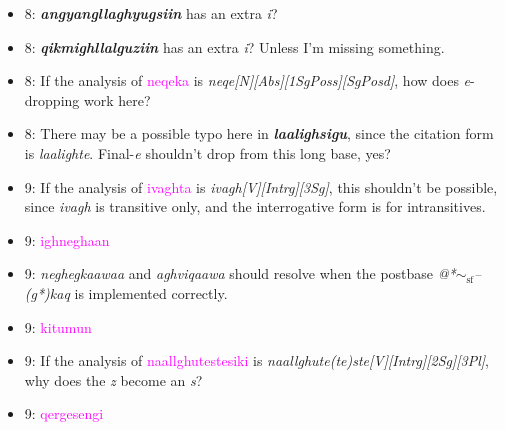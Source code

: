 \documentclass{article}
\begin{document}
\begin{itemize}
\item 8: \textit{\textbf{angyangllaghyugsiin}} has an extra \textit{i}?

\item 8: \textit{\textbf{qikmighllalguziin}} has an extra \textit{i}?
%
Unless I'm missing something.

\item 8: If the analysis of \textcolor{magenta}{neqeka} is \textit{neqe[N][Abs][1SgPoss][SgPosd]}, how does \textit{e}-dropping work here?

\item 8: There may be a possible typo here in \textit{\textbf{laalighsigu}}, since the citation form is \textit{laalighte}.
%
Final-\textit{e} shouldn't drop from this long base, yes?

\item 9: If the analysis of \textcolor{magenta}{ivaghta} is \textit{ivagh[V][Intrg][3Sg]}, this shouldn't be possible, since \textit{ivagh} is transitive only, and the interrogative form is for intransitives.

\item 9: \textcolor{magenta}{ighneghaan}

\item 9: \textit{neghegkaawaa} and \textit{aghviqaawa} should resolve when the postbase \textit{@*$\sim_\text{sf}$--(g*)kaq} is implemented correctly.

\item 9: \textcolor{magenta}{kitumun}

\item 9: If the analysis of \textcolor{magenta}{naallghutestesiki} is \textit{naallghute(te)ste[V][Intrg][2Sg][3Pl]}, why does the \textit{z} become an \textit{s}?

\item 9: \textcolor{magenta}{qergesengi}

\end{itemize}
\end{document}
